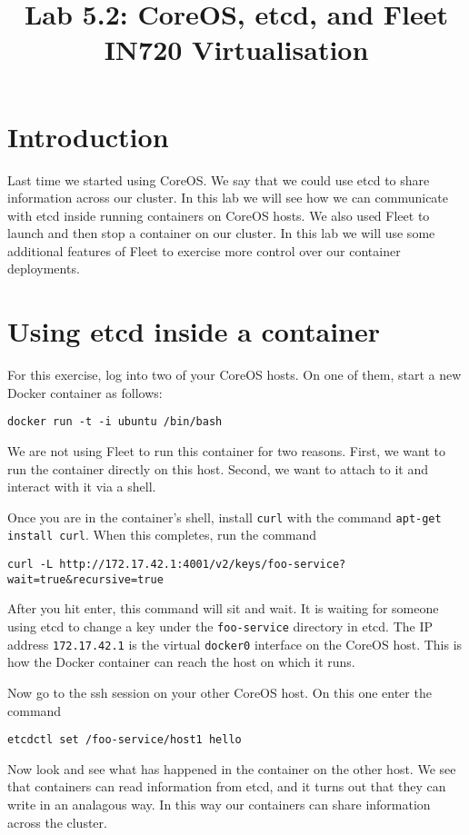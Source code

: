 \documentclass{article}
\begin{document}
\title{Lab 5.2: CoreOS, etcd, and Fleet \\ IN720 Virtualisation}
\date{}
\maketitle

\section*{Introduction}
Last time we started using CoreOS. We say that we could use etcd to share information across our cluster.  In this lab we will see how we can communicate with etcd inside running containers on CoreOS hosts.  We also used Fleet to launch and then stop a container on our cluster.  In this lab we will use some additional features of Fleet to exercise more control over our container deployments.

\section{Using etcd inside a container}
For this exercise, log into two of your CoreOS hosts.  On one of them, start a new Docker container as follows:

\texttt{docker run -t -i ubuntu /bin/bash}

We are not using Fleet to run this container for two reasons.  First, we want to run the container directly on this host.  Second, we want to attach to it and interact with it via a shell.  

Once you are in the container's shell, install \texttt{curl} with the command \texttt{apt-get install curl}. When this completes, run the command

\texttt{curl -L http://172.17.42.1:4001/v2/keys/foo-service?wait=true\&recursive=true}
	
After you hit enter, this command will sit and wait. It is waiting for someone using etcd to change a key under the \texttt{foo-service} directory in etcd.  The IP address \texttt{172.17.42.1} is the virtual \texttt{docker0} interface on the CoreOS host.  This is how the Docker container can reach the host on which it runs.

Now go to the ssh session on your other CoreOS host.  On this one enter the command

\texttt{etcdctl set /foo-service/host1 hello}

Now look and see what has happened in the container on the other host. We see that containers can read information from etcd, and it turns out that they can write in an analagous way. In this way our containers can share information across the cluster.
\end{document}
